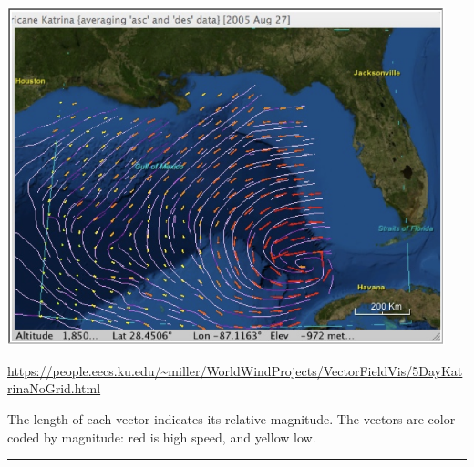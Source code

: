 \documentclass[12pt,letterpaper,noanswers]{exam}
\begin{document}
\includegraphics[width=5in]{img/N24_p2.png}

\url{https://people.eecs.ku.edu/~miller/WorldWindProjects/VectorFieldVis/5DayKatrinaNoGrid.html}



The length of each vector indicates its relative magnitude.  The vectors are color coded by magnitude: red is high speed, and yellow low.  


\vspace{0.2cm}
\hrule
\vspace{0.2cm}






\end{document}
